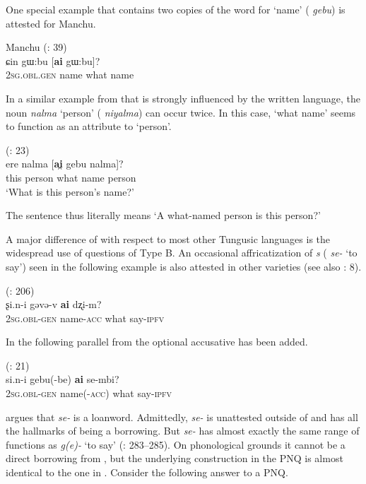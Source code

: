 \documentclass[output=paper,colorlinks,citecolor=brown]{langscibook}
\begin{document}
One special example that contains two copies of the word for ‘name’ ( \textit{gebu}) is attested for  Manchu.

\ea
    \label{example4.115}
     Manchu (\citealt{Enhebatu1995H}: 39)\\
    \gll ɕin		gɯ:bu	[\textbf{ai}		gɯ:bu]?\\
    2\textsc{sg.obl.gen}		name	what		name\\
    \z

\noindent In a similar example from  that is strongly influenced by the written language, the noun \textit{nalma} ‘person’ ( \textit{niyalma}) can occur twice. In this case, ‘what name’ seems to function as an attribute to ‘person’.

\ea
    \label{example4.116}
     (\citealt{Kałużyński1977}: 23)\\
    \gll ere		nalma	[\textbf{ai̯}		gebu	nalma]?\\
    this		person	what		name	person\\
    \glt ‘What is this person’s name?’
    \z

\noindent The sentence thus literally means ‘A what-named person is this person?’

A major difference of  with respect to most other Tungusic languages is the widespread use of questions of Type B. An occasional affricatization of \textit{s} ( \textit{se-} ‘to say’) seen in the following  example is also attested in other  varieties (see also \citealt{Chaoke2014d}: 8).

\ea
    \label{example4.117}
     (\citealt{Chaoke2006}: 206)\\
    \gll ʂi.n-i			gəvə-v		\textbf{ai}		dʐi-m?\\
    2\textsc{sg.obl-gen}		name-\textsc{acc}		what		say-\textsc{ipfv}\\
    \z

\noindent In the following parallel from  the optional accusative has been added.

\ea
    \label{example4.118}
     (\citealt{He2009}: 21)\\
    \gll si.n-i			gebu(-be)	\textbf{ai}		se-mbi?\\
    2\textsc{sg.obl-gen}		name(-\textsc{acc})	what		say-\textsc{ipfv}\\
    \z

\noindent \citet[259]{Vovin2006} argues that  \textit{se-} is a  loanword. Admittedly, \textit{se-} is unattested outside of  and has all the hallmarks of being a borrowing. But  \textit{se-} has almost exactly the same range of functions as  \textit{g(e)-} ‘to say’ (\citealt{Janhunen2012b}: 283–285). On phonological grounds it cannot be a direct borrowing from , but the underlying construction in the PNQ is almost identical to the one in . Consider the following answer to a PNQ.
\end{document}
